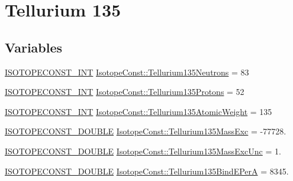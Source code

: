 \hypertarget{group___isotope_const-_tellurium-_te135}{}\section{Tellurium 135}
\label{group___isotope_const-_tellurium-_te135}
\subsection*{Variables}
\begin{DoxyCompactItemize}
\item 
\mbox{\hyperlink{group___isotope_const-_macros_ga5f18360b3e99483a35c32d789e62621c}{I\+S\+O\+T\+O\+P\+E\+C\+O\+N\+S\+T\+\_\+\+I\+NT}} \mbox{\hyperlink{group___isotope_const-_tellurium-_te135_ga570154c4e685a16aece28e1165c65f8b}{Isotope\+Const\+::\+Tellurium135\+Neutrons}} = 83
\item 
\mbox{\hyperlink{group___isotope_const-_macros_ga5f18360b3e99483a35c32d789e62621c}{I\+S\+O\+T\+O\+P\+E\+C\+O\+N\+S\+T\+\_\+\+I\+NT}} \mbox{\hyperlink{group___isotope_const-_tellurium-_te135_ga5f4db29a80cddfdfa717f71aa3cb665a}{Isotope\+Const\+::\+Tellurium135\+Protons}} = 52
\item 
\mbox{\hyperlink{group___isotope_const-_macros_ga5f18360b3e99483a35c32d789e62621c}{I\+S\+O\+T\+O\+P\+E\+C\+O\+N\+S\+T\+\_\+\+I\+NT}} \mbox{\hyperlink{group___isotope_const-_tellurium-_te135_gaf1ba77ceeef973b6f8d35d4f48cbafc5}{Isotope\+Const\+::\+Tellurium135\+Atomic\+Weight}} = 135
\item 
\mbox{\hyperlink{group___isotope_const-_macros_ga8f45a7272ce02c0b4c65c44636ed719a}{I\+S\+O\+T\+O\+P\+E\+C\+O\+N\+S\+T\+\_\+\+D\+O\+U\+B\+LE}} \mbox{\hyperlink{group___isotope_const-_tellurium-_te135_ga537cee33b9134f803a34a22e03da68f3}{Isotope\+Const\+::\+Tellurium135\+Mass\+Exc}} = -\/77728.
\item 
\mbox{\hyperlink{group___isotope_const-_macros_ga8f45a7272ce02c0b4c65c44636ed719a}{I\+S\+O\+T\+O\+P\+E\+C\+O\+N\+S\+T\+\_\+\+D\+O\+U\+B\+LE}} \mbox{\hyperlink{group___isotope_const-_tellurium-_te135_ga5a64bd7a0f43aea1f67807c107210115}{Isotope\+Const\+::\+Tellurium135\+Mass\+Exc\+Unc}} = 1.
\item 
\mbox{\hyperlink{group___isotope_const-_macros_ga8f45a7272ce02c0b4c65c44636ed719a}{I\+S\+O\+T\+O\+P\+E\+C\+O\+N\+S\+T\+\_\+\+D\+O\+U\+B\+LE}} \mbox{\hyperlink{group___isotope_const-_tellurium-_te135_gab981ad1c28e5a7684ab43b1c982b19e6}{Isotope\+Const\+::\+Tellurium135\+Bind\+E\+PerA}} = 8345.
\item 

\end{DoxyCompactItemize}
